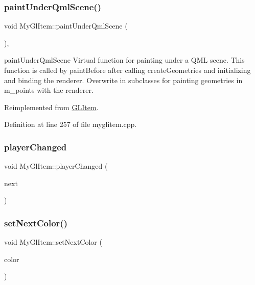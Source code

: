 \subsubsection{\texorpdfstring{paintUnderQmlScene()}{paintUnderQmlScene()}}
{\footnotesize\ttfamily void My\+Gl\+Item\+::paint\+Under\+Qml\+Scene (\begin{DoxyParamCaption}{ }\end{DoxyParamCaption})\hspace{0.3cm}{\ttfamily [override]}, {\ttfamily [virtual]}}



paint\+Under\+Qml\+Scene Virtual function for painting under a Q\+ML scene. This function is called by paint\+Before after calling create\+Geometries and initializing and binding the renderer. Overwrite in subclasses for painting geometries in m\+\_\+points with the renderer. 



Reimplemented from \mbox{\hyperlink{class_g_l_item_a6e779fa84599e999b6e299d5aac92fa2}{G\+L\+Item}}.



Definition at line 257 of file myglitem.\+cpp.

\mbox{\label{class_my_gl_item_a93137c1e883f74e699e3dd164cd1cd43}} 
\subsubsection{\texorpdfstring{playerChanged}{playerChanged}}
{\footnotesize\ttfamily void My\+Gl\+Item\+::player\+Changed (\begin{DoxyParamCaption}\item[{Q\+String}]{next }\end{DoxyParamCaption})\hspace{0.3cm}{\ttfamily [signal]}}

\mbox{\label{class_my_gl_item_a775133f2d5f5fee4b90f4816ac00d57e}} 
\subsubsection{\texorpdfstring{setNextColor()}{setNextColor()}}
{\footnotesize\ttfamily void My\+Gl\+Item\+::set\+Next\+Color (\begin{DoxyParamCaption}\item[{const Q\+String}]{color }\end{DoxyParamCaption})\hspace{0.3cm}{\ttfamily [inline]}}




